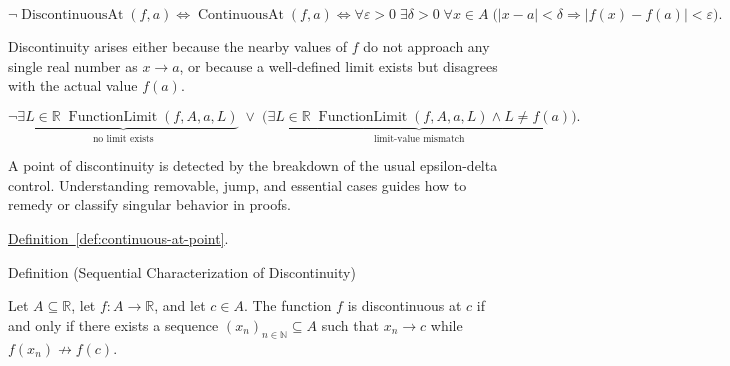 \begin{remark*}
\[
\neg \operatorname{DiscontinuousAt}(f,a)
\Longleftrightarrow
\operatorname{ContinuousAt}(f,a)
\Longleftrightarrow
\forall \varepsilon > 0\; \exists \delta > 0\; \forall x \in A\;
\bigl(|x-a|<\delta \Rightarrow |f(x)-f(a)| < \varepsilon\bigr).
\]
\end{remark*}

\begin{remark*}
Discontinuity arises either because the nearby values of $f$ do not approach any single real number as $x \to a$, or because a well-defined limit exists but disagrees with the actual value $f(a)$.
\end{remark*}

\begin{remark*}
\[
\underbrace{\neg \exists L \in \mathbb{R}\; \operatorname{FunctionLimit}(f,A,a,L)}_{\text{no limit exists}}
\;\lor\;
\underbrace{\bigl(\exists L \in \mathbb{R}\; \operatorname{FunctionLimit}(f,A,a,L) \land L \ne f(a)\bigr)}_{\text{limit-value mismatch}}.
\]
\end{remark*}

\begin{remark*}[Interpretation]
A point of discontinuity is detected by the breakdown of the usual epsilon-delta control. Understanding removable, jump, and essential cases guides how to remedy or classify singular behavior in proofs.
\end{remark*}

\begin{remark*}[Dependencies]
\hyperref[def:continuous-at-point]{Definition~\ref*{def:continuous-at-point}}.
\end{remark*}


\begin{definitionbox}{Definition (Sequential Characterization of Discontinuity)}
\begin{definition}
\label{def:sequential-discontinuity-at-a-point}
Let $A \subseteq \mathbb{R}$, let $f:A \to \mathbb{R}$, and let $c \in A$. The function $f$ is discontinuous at $c$ if and only if there exists a sequence $(x_n)_{n\in\mathbb{N}} \subseteq A$ such that $x_n \to c$ while $f(x_n) \not\to f(c)$.
\end{definition}
\end{definitionbox}

